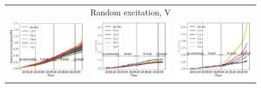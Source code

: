 \documentclass[
prstab
,reprint
,linenumbers
,longbibliography
,preprintnumbers
,showkeys
,amsfonts,amssymb,amsmath
,floatfix
]{revtex4-1}
\newlength{\thirdwidth}
\begin{document}
\begin{figure}
  \begin{tabular}{ccc}
    \multicolumn{3}{c}{Random excitation, V} \\
    \includegraphics[width=\thirdwidth]{2017_bunch_intensity_vran_no_damper_avg.png} &
    \includegraphics[width=\thirdwidth]{2017_emith_avg_rel_vran_no_damper.png} &
    \includegraphics[width=\thirdwidth]{2017_emitv_avg_rel_vran_no_damper.png} \\

\end{tabular}
\end{figure}
\end{document}
